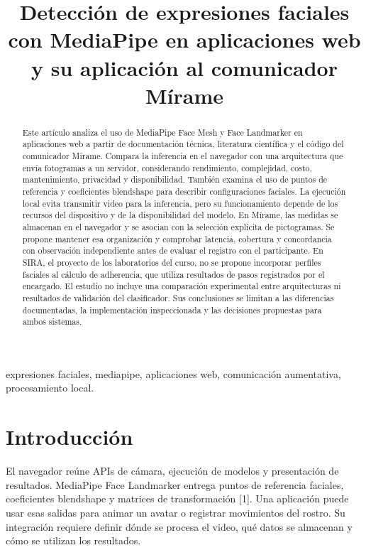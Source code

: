 \documentclass[conference,letterpaper]{IEEEtran}
\begin{document}
\shorthandoff{<>}
\title{Detección de expresiones faciales con MediaPipe en aplicaciones web y su aplicación al comunicador Mírame}
\author{
}
\maketitle
\begin{abstract}
Este artículo analiza el uso de MediaPipe Face Mesh y Face Landmarker en aplicaciones web a partir de documentación técnica, literatura científica y el código del comunicador Mírame. Compara la inferencia en el navegador con una arquitectura que envía fotogramas a un servidor, considerando rendimiento, complejidad, costo, mantenimiento, privacidad y disponibilidad. También examina el uso de puntos de referencia y coeficientes blendshape para describir configuraciones faciales. La ejecución local evita transmitir video para la inferencia, pero su funcionamiento depende de los recursos del dispositivo y de la disponibilidad del modelo. En Mírame, las medidas se almacenan en el navegador y se asocian con la selección explícita de pictogramas. Se propone mantener esa organización y comprobar latencia, cobertura y concordancia con observación independiente antes de evaluar el registro con el participante. En SIRA, el proyecto de los laboratorios del curso, no se propone incorporar perfiles faciales al cálculo de adherencia, que utiliza resultados de pasos registrados por el encargado. El estudio no incluye una comparación experimental entre arquitecturas ni resultados de validación del clasificador. Sus conclusiones se limitan a las diferencias documentadas, la implementación inspeccionada y las decisiones propuestas para ambos sistemas.
\end{abstract}
\begin{IEEEkeywords}
expresiones faciales, mediapipe, aplicaciones web, comunicación aumentativa, procesamiento local.
\end{IEEEkeywords}

\section{Introducción}
El navegador reúne APIs de cámara, ejecución de modelos y presentación de resultados. MediaPipe Face Landmarker entrega puntos de referencia faciales, coeficientes blendshape y matrices de transformación [1]. Una aplicación puede usar esas salidas para animar un avatar o registrar movimientos del rostro. Su integración requiere definir dónde se procesa el video, qué datos se almacenan y cómo se utilizan los resultados.
\end{document}
